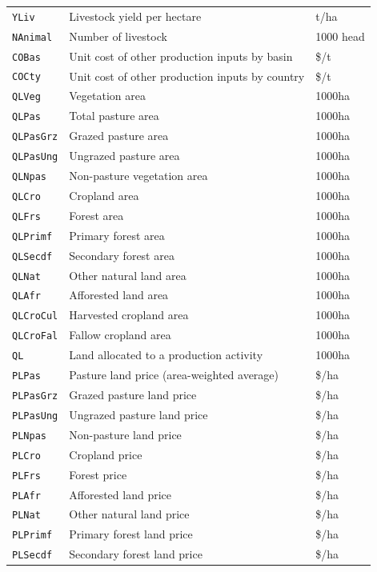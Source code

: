 \begin{xltabular}{\linewidth}{l X l}
  \texttt{YLiv} & Livestock yield per hectare & t/ha \\
  \texttt{NAnimal} & Number of livestock & 1000 head \\
  \texttt{COBas} & Unit cost of other production inputs by basin & \$/t \\
  \texttt{COCty} & Unit cost of other production inputs by country & \$/t \\
  \texttt{QLVeg} & Vegetation area & 1000ha \\
  \texttt{QLPas} & Total pasture area & 1000ha \\
  \texttt{QLPasGrz} & Grazed pasture area & 1000ha \\
  \texttt{QLPasUng} & Ungrazed pasture area & 1000ha \\
  \texttt{QLNpas} & Non-pasture vegetation area & 1000ha \\
  \texttt{QLCro} & Cropland area & 1000ha \\
  \texttt{QLFrs} & Forest area & 1000ha \\
  \texttt{QLPrimf} & Primary forest area & 1000ha \\
  \texttt{QLSecdf} & Secondary forest area & 1000ha \\
  \texttt{QLNat} & Other natural land area & 1000ha \\
  \texttt{QLAfr} & Afforested land area & 1000ha \\
  \texttt{QLCroCul} & Harvested cropland area & 1000ha \\
  \texttt{QLCroFal} & Fallow cropland area & 1000ha \\
  \texttt{QL} & Land allocated to a production activity & 1000ha \\
  \texttt{PLPas} & Pasture land price (area-weighted average) & \$/ha \\
  \texttt{PLPasGrz} & Grazed pasture land price & \$/ha \\
  \texttt{PLPasUng} & Ungrazed pasture land price & \$/ha \\
  \texttt{PLNpas} & Non-pasture land price & \$/ha \\
  \texttt{PLCro} & Cropland price & \$/ha \\
  \texttt{PLFrs} & Forest price & \$/ha \\
  \texttt{PLAfr} & Afforested land price & \$/ha \\
  \texttt{PLNat} & Other natural land price & \$/ha \\
  \texttt{PLPrimf} & Primary forest land price & \$/ha \\
  \texttt{PLSecdf} & Secondary forest land price & \$/ha \\

\end{xltabular}
